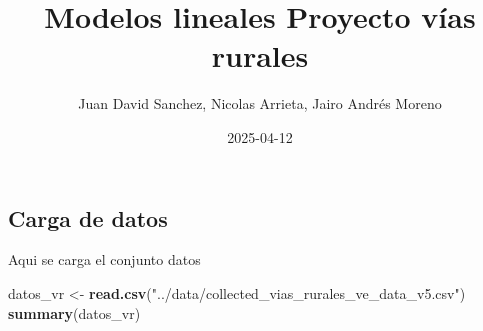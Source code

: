 \documentclass[
]{article}
\title{Modelos lineales Proyecto vías rurales}
\author{Juan David Sanchez, Nicolas Arrieta, Jairo Andrés Moreno}
\date{2025-04-12}
\newenvironment{Shaded}{\begin{snugshade}}{\end{snugshade}}
\newcommand{\FunctionTok}[1]{\textcolor[rgb]{0.13,0.29,0.53}{\textbf{#1}}}
\newcommand{\NormalTok}[1]{#1}
\newcommand{\OtherTok}[1]{\textcolor[rgb]{0.56,0.35,0.01}{#1}}
\newcommand{\StringTok}[1]{\textcolor[rgb]{0.31,0.60,0.02}{#1}}
\begin{document}
\maketitle

\subsection{Carga de datos}\label{carga-de-datos}

Aqui se carga el conjunto datos

\begin{Shaded}
\begin{Highlighting}[]
\NormalTok{datos\_vr }\OtherTok{\textless{}{-}} \FunctionTok{read.csv}\NormalTok{(}\StringTok{"../data/collected\_vias\_rurales\_ve\_data\_v5.csv"}\NormalTok{)}
\FunctionTok{summary}\NormalTok{(datos\_vr)}
\end{Highlighting}
\end{Shaded}
\end{document}
